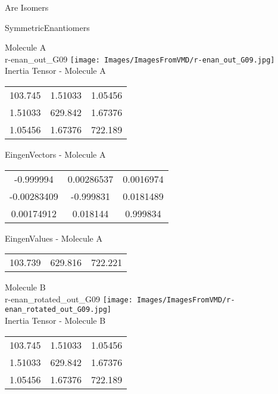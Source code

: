\begin{center}
\vtab
\vtab
\textcolor{NavyBlue}{\Large Are Isomers}
\end{center}
\newpage

\vtab[-2cm]
\begin{center}
{\large SymmetricEnantiomers}
\end{center}
\begin{multicols}{2}
\begin{center}
Molecule A \\ 
r-enan\_out\_G09
\texttt{[image: Images/ImagesFromVMD/r-enan\_out\_G09.jpg]}
\\
Inertia Tensor - Molecule A \\
\vtab
\begin{tabular}{|c c c|}
103.745	 & 	1.51033	 & 	1.05456	 \\
1.51033	 & 	629.842	 & 	1.67376	 \\
1.05456	 & 	1.67376	 & 	722.189
\end{tabular}

\vtab
 EingenVectors - Molecule A     \\
\vtab
\begin{tabular}{|c c c|}
-0.999994	 & 	0.00286537	 & 	0.0016974	 \\
-0.00283409	 & 	-0.999831	 & 	0.0181489	 \\
0.00174912	 & 	0.018144	 & 	0.999834
\end{tabular}

\vtab
 EingenValues - Molecule A     \\
\vtab
\begin{tabular}{|c c c|}
103.739	 & 	629.816	 & 	722.221
\end{tabular}
\columnbreak

Molecule B \\ 
r-enan\_rotated\_out\_G09
\texttt{[image: Images/ImagesFromVMD/r-enan\_rotated\_out\_G09.jpg]}
\\
Inertia Tensor - Molecule B \\
\vtab
\begin{tabular}{|c c c|}
103.745	 & 	1.51033	 & 	1.05456	 \\
1.51033	 & 	629.842	 & 	1.67376	 \\
1.05456	 & 	1.67376	 & 	722.189
\end{tabular}


\end{center}
\end{multicols}
